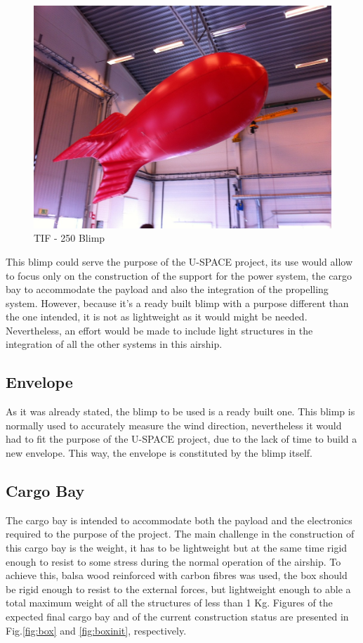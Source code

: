\begin{figure}[bht]
\centering
\includegraphics[scale=0.5]{figures/blimp.jpg}
\caption{TIF - 250 Blimp}
\label{fig:blimp}
\end{figure}

This blimp could serve the purpose of the U-SPACE project, its use would allow to focus only on the construction of the support for the power system, the cargo bay to accommodate the payload and also the integration of the propelling system. However, because it's a ready built blimp with a purpose different than the one intended, it is not as lightweight as it would might be needed. Nevertheless, an effort would be made to include light structures in the integration of all the other systems in this airship.

\subsection{Envelope}

As it was already stated, the blimp to be used is a ready built one. This blimp is normally used to accurately measure the wind direction, nevertheless it would had to fit the purpose of the U-SPACE project, due to the lack of time to build a new envelope. This way, the envelope is constituted by the blimp itself.  

\subsection{Cargo Bay}

The cargo bay is intended to accommodate both the payload and the electronics required to the purpose of the project. The main challenge in the construction of this cargo bay is the weight, it has to be lightweight but at the same time rigid enough to resist to some stress during the normal operation of the airship. To achieve this, balsa wood reinforced with carbon fibres was used, the box should be rigid enough to resist to the external forces, but lightweight enough to able a total maximum weight of all the structures of less than 1 Kg. Figures of the expected final cargo bay and of the current construction status are presented in Fig.\ref{fig:box} and \ref{fig:boxinit}, respectively. 

